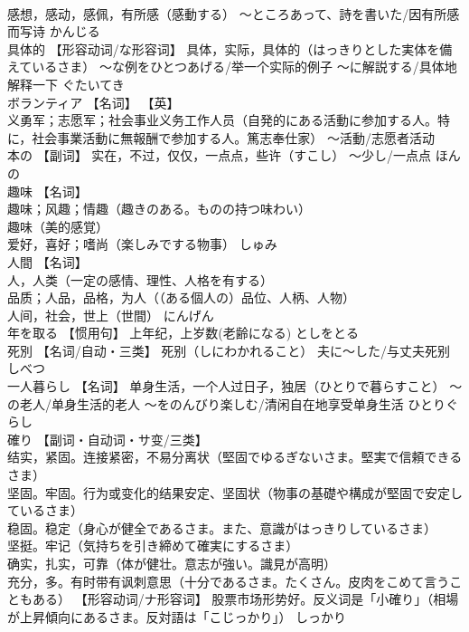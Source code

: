 \documentclass[8pt]{extreport}
\begin{document}
\begin{CJK}{UTF8}{min}
\\	感想，感动，感佩，有所感（感動する） ～ところあって、詩を書いた/因有所感而写诗	かんじる	
\\	具体的	【形容动词/な形容词】 具体，实际，具体的（はっきりとした実体を備えているさま） 〜な例をひとつあげる/举一个实际的例子 〜に解説する/具体地解释一下	ぐたいてき	
\\	ボランティア	【名词】 【英】
\\	义勇军；志愿军；社会事业义务工作人员（自発的にある活動に参加する人。特に，社会事業活動に無報酬で参加する人。篤志奉仕家） ～活動/志愿者活动		
\\	本の	【副词】 实在，不过，仅仅，一点点，些许（すこし） 〜少し/一点点	ほんの	
\\	趣味	【名词】 
\\	趣味；风趣；情趣（趣きのある。ものの持つ味わい） 
\\	趣味（美的感覚） 
\\	爱好，喜好；嗜尚（楽しみでする物事）	しゅみ	
\\	人間	【名词】 
\\	人，人类（一定の感情、理性、人格を有する） 
\\	品质；人品，品格，为人（（ある個人の）品位、人柄、人物） 
\\	人间，社会，世上（世間）	にんげん	
\\	年を取る	【惯用句】 上年纪，上岁数(老齢になる)	としをとる	
\\	死別	【名词/自动・三类】 死别（しにわかれること） 夫に～した/与丈夫死别	しべつ	
\\	一人暮らし	【名词】 单身生活，一个人过日子，独居（ひとりで暮らすこと） ～の老人/单身生活的老人 ～をのんびり楽しむ/清闲自在地享受单身生活	ひとりぐらし	
\\	確り	【副词・自动词・サ变/三类】 
\\	结实，紧固。连接紧密，不易分离状（堅固でゆるぎないさま。堅実で信頼できるさま） 
\\	坚固。牢固。行为或变化的结果安定、坚固状（物事の基礎や構成が堅固で安定しているさま） 
\\	稳固。稳定（身心が健全であるさま。また、意識がはっきりしているさま） 
\\	坚挺。牢记（気持ちを引き締めて確実にするさま） 
\\	确实，扎实，可靠（体が健壮。意志が強い。識見が高明） 
\\	充分，多。有时带有讽刺意思（十分であるさま。たくさん。皮肉をこめて言うこともある） 【形容动词/ナ形容词】 股票市场形势好。反义词是「小確り」（相場が上昇傾向にあるさま。反対語は「こじっかり」）	しっかり	

\end{CJK}
\end{document}
